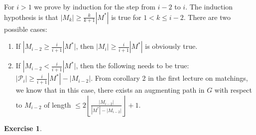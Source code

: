 \documentclass[a4paper,12pt,headsepline]{scrartcl}
\newtheorem{aufgabe}{Exercise}
\begin{document}

For $i>1$ we prove by induction for the step from $i-2$ to $i$.
The induction hypothesis is that $|M_k|\ge \frac{k}{k+1}|M^*|$ is true for $1<k\le i-2$.
There are two possible cases:
\begin{enumerate}
    \item If $|M_{i-2}\ge \frac{i}{i+1}|M^*|$, then $|M_i|\ge \frac{i}{i+1}|M^*|$ is obviously true.
    \item If $|M_{i-2}< \frac{i}{i+1}|M^*|$, then the following needs to be true: $|\mathcal P_i|\ge \frac{i}{i+1}|M^*|-|M_{i-2}|$.
        From corollary 2 in the first lecture on matchings, we know that in this case, there exists an augmenting path in $G$ with respect to $M_{i-2}$ of length $\le 2\left\lfloor\frac{|M_{i-2}|}{|M^*|-|M_{i-2}|}\right\rfloor+1$.
\end{enumerate}

\newpage
\begin{aufgabe}
\end{aufgabe}
\end{document}
